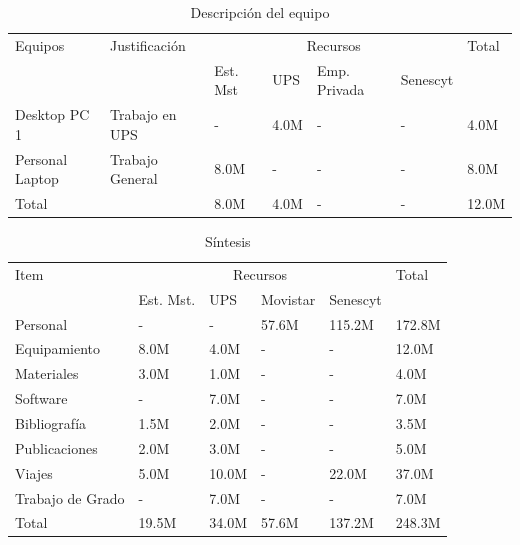 \documentclass[12pt,a4paper]{article}
\begin{document}
\begin{table}[ht!]
\caption{Descripción del equipo}
\begin{tabular}{|p{3.4cm}|p{3.4cm}|p{1.1cm}|p{1.1cm}|p{1.1cm}|p{1.1cm}|p{1.1cm}|} \hline
Equipos & Justificación & \multicolumn{4}{|c|}{Recursos} & Total \\ \cline{3-6}
 &   & Est. Mst & UPS & Emp. Privada & Senescyt &  \\ \hline \hline
Desktop PC 1 & Trabajo en UPS  & - & 4.0M & - & - & 4.0M \\ \hline
Personal Laptop & Trabajo General & 8.0M & - & - & - & 8.0M \\ \hline
Total &    & 8.0M & 4.0M & - & - & 12.0M \\ \hline
\end{tabular}
\end{table}

\begin{table}[H]
\caption{Síntesis}
\begin{tabular}{|p{7.0cm}|p{1.1cm}|p{1.1cm}|p{1.1cm}|p{1.1cm}|p{1.1cm}|} \hline
Item & \multicolumn{4}{|c|}{Recursos} & Total \\ \cline{2-5}
  & Est. Mst. & UPS & Movistar & Senescyt &  \\ \hline \hline

Personal     & -    & -    & 57.6M & 115.2M & 172.8M \\ \hline
Equipamiento    & 8.0M & 4.0M & -     & -      & 12.0M \\ \hline
Materiales     & 3.0M & 1.0M & -     & -      & 4.0M \\ \hline
Software      & -    & 7.0M & -     & -      & 7.0M \\ \hline
Bibliografía  & 1.5M & 2.0M & -     & -      & 3.5M \\ \hline
Publicaciones  & 2.0M & 3.0M & -     & -      & 5.0M \\ \hline
Viajes         & 5.0M & 10.0M& -     & 22.0M  &37.0M \\ \hline
Trabajo de Grado        & -    & 7.0M & -     & -      & 7.0M \\ \hline
Total         &19.5M & 34.0M& 57.6M & 137.2M & 248.3M \\ \hline
\end{tabular}
\end{table}


\end{document}
